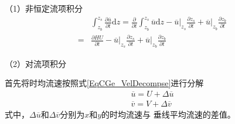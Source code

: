 （1）非恒定流项积分
\begin{equation}
  \begin{aligned}
    &
    \int_{z_{b}}^{ z_{s}}\!
    \frac{\partial \overline{u}}{\partial t}
    \mathrm{d}z
    =
    \frac{\partial}{\partial t}
    \int_{z_{b}}^{ z_{s}}\!
    \overline{u}
    \mathrm{d}z
    -
    \left.\overline{u}\right|_{z_{s}}\frac{\partial  z_{s}}{\partial t}
    +
    \left.\overline{u}\right|_{z_{b}}\frac{\partial z_{b}}{\partial t}
    \\
    =&
    \frac{\partial HU}{\partial t}
    -
    \left.\overline{u}\right|_{z_{s}}\frac{\partial  z_{s}}{\partial t}
    +
    \left.\overline{u}\right|_{z_{b}}\frac{\partial z_{b}}{\partial t}
  \end{aligned}
  \label{EqCGe_Mex_US_Int}
\end{equation}

（2）对流项积分

首先将时均流速按照式\eqref{EqCGe_VelDecompse}进行分解
\begin{equation}
  \begin{aligned}
    \overline{u}
    =
    U+\Delta\overline{u}
    \\
    \overline{v}
    =
    V+\Delta\overline{v}
  \end{aligned}
  \label{EqCGe_VelDecompse}
\end{equation}
式中，$\Delta\overline{u}$和$\Delta\overline{v}$分别为$x$和$y$的时均流速与
垂线平均流速的差值。

